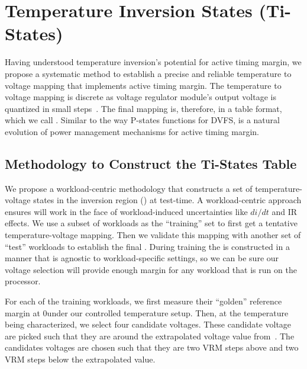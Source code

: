 \section{Temperature Inversion States (Ti-States)}
\label{sec:temperature:tistate}

Having understood temperature inversion's potential for active timing margin, we propose a systematic method to establish a precise and reliable temperature to voltage mapping that implements active timing margin. The temperature to voltage mapping is discrete as voltage regulator module's output voltage is quantized in small steps~\cite{intelVRM}. The final mapping is, therefore, in a table format, which we call \tistates. Similar to the way P-states functions for DVFS, \tistate is a natural evolution of power management mechanisms for active timing margin.

\subsection{Methodology to Construct the Ti-States Table}
\label{sec:temperature:temperature:construct}

We propose a workload-centric methodology that constructs a set of temperature-voltage states in the inversion region (\tistates) at test-time. A workload-centric approach ensures \tistates will work in the face of workload-induced uncertainties like $di/dt$ and IR effects. We use a subset of workloads as the ``training'' set to first get a tentative temperature-voltage mapping. Then we validate this mapping with another set of ``test'' workloads to establish the final \tistate. During training the \tistate is constructed in a manner that is agnostic to workload-specific settings, so we can be sure our voltage selection will provide enough margin for any workload that is run on the processor.

For each of the training workloads, we first measure their ``golden'' reference margin at 0\C under our controlled temperature setup. Then, at the temperature being characterized, we select four candidate voltages. These candidate voltage are picked such that they are around the extrapolated voltage value from~. The candidates voltages are chosen such that they are two VRM steps above and two VRM steps below the extrapolated value. 

